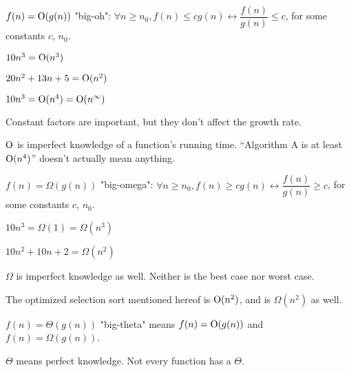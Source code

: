 \begin{defn}
$f(n) = {\rm O}(g(n))$ "big-oh": $\forall n \geq n_0, f(n) \leq cg(n) \leftrightarrow \dfrac{f(n)}{g(n)} \leq c$, for some constants $c$, $n_0$.
\end{defn}

\begin{ex}
$10n^3 = {\rm O}(n^3)$
\end{ex}

\begin{ex}
$20n^2 + 13n + 5 = {\rm O}(n^2)$
\end{ex}

\begin{ex}
$10n^3 = {\rm O}(n^4) = {\rm O}(n^\infty)$
\end{ex}

Constant factors are important, but they don't affect the growth rate.

${\rm O}$ is imperfect knowledge of a function's running time. ``Algorithm A is at least ${\rm O}(n^4)$'' doesn't actually mean anything.

\begin{defn}
$f(n) = \Omega (g(n))$ "big-omega": $\forall n \geq n_0, f(n) \geq cg(n) \leftrightarrow \dfrac{f(n)}{g(n)} \geq c$, for some constants $c$, $n_0$.
\end{defn}

\begin{ex}
$10n^3 = \Omega(1) = \Omega(n^3)$
\end{ex}

\begin{ex}
$10n^2 + 10n + 2 = \Omega(n^2)$
\end{ex}

$\Omega$ is imperfect knowledge as well. Neither is the best case nor worst case.

The optimized selection sort mentioned hereof is ${\rm O}(n^2)$, and is $\Omega(n^2)$ as well.

\begin{defn}
$f(n) = \Theta(g(n))$ "big-theta" means $f(n) = {\rm O}(g(n))$ and $f(n) = \Omega(g(n))$.
\end{defn}

$\Theta$ means perfect knowledge. Not every function has a $\Theta$.
